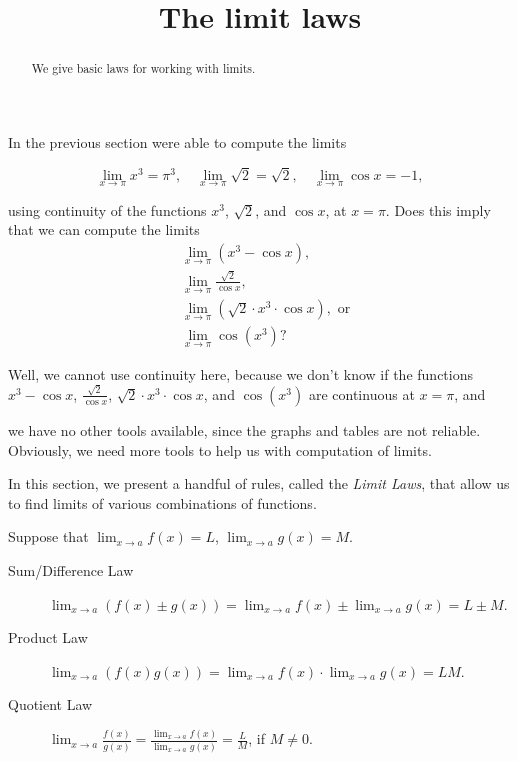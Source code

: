 \documentclass{ximera}
\title[Dig-In:]{The limit laws}
\begin{document}
\begin{abstract}
We give basic laws for working with limits. 
\end{abstract}
\maketitle
In the previous section were able to compute the limits

\[
\lim_{x\to \pi} x^3=\pi^3,\quad\lim_{x\to \pi} \sqrt{2}=\sqrt{2},\quad\lim_{x\to \pi} \cos{x}= -1,
\]

using continuity of the functions $x^3$, $\sqrt{2}$, and $\cos{x}$, at
$x=\pi$.  Does this imply that we can compute the limits
\begin{align*}
  &\lim_{x\to \pi} (x^3-\cos{x}),\\
  &\lim_{x\to \pi} \frac{\sqrt{2}}{\cos{x}},\\
  &\lim_{x\to \pi} (\sqrt{2}\cdot x^3\cdot\cos{x}), \text{ or}\\
  &\lim_{x\to \pi} \cos({x^3})?
\end{align*}

Well, we cannot use continuity here, because we don't know if the
functions $x^3-\cos{x}$, $\frac{\sqrt{2}}{\cos{x}}$, $\sqrt{2}\cdot
x^3\cdot\cos{x}$, and $\cos({x^3})$ are continuous at $x=\pi$, and

 we have no other tools available, since the graphs and tables are not reliable. Obviously, we need more tools to help us with computation of limits.

 

In this section, we present a handful of rules, called the \textit{Limit Laws},
that allow us to find limits of various combinations of functions.

\begin{theorem}\label{theorem:limit-laws}
Suppose that $\lim_{x\to a}f(x)=L$, $\lim_{x\to a}g(x)=M$.
\begin{description}
\item[Sum/Difference Law] $\lim_{x\to a} (f(x) \pm g(x)) =
  \lim_{x\to a}f(x) \pm \lim_{x\to a}g(x)=L \pm M$.
\item[Product Law]  $\lim_{x\to a} (f(x)g(x)) = \lim_{x\to
  a}f(x)\cdot\lim_{x\to a}g(x)=LM$.
\item[Quotient Law]  $\lim_{x\to a} \frac{f(x)}{g(x)} =
  \frac{\lim_{x\to a}f(x)}{\lim_{x\to a}g(x)}=\frac{L}{M}$, if
  $M\ne0$.
\end{description}
\label{thm:limit laws}
\end{theorem}
\end{document}
